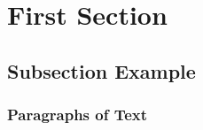 \section{First Section}

\subsection{Subsection Example}

\begin{frame}
\frametitle{Paragraphs of Text}
\end{frame}
